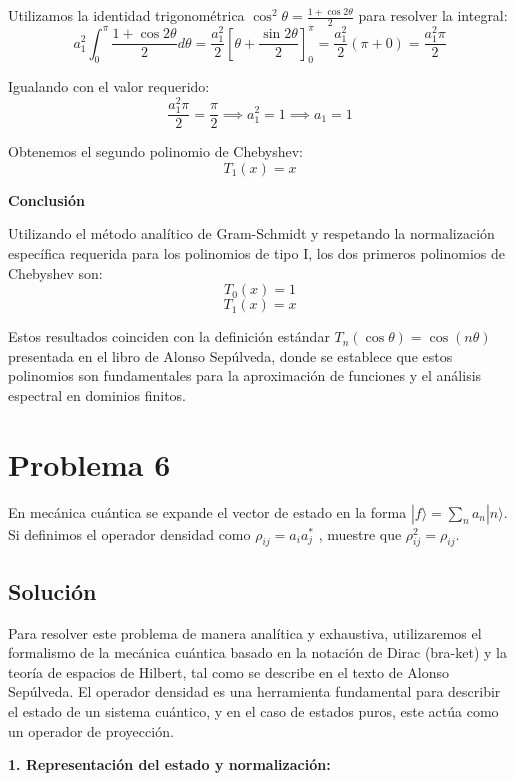 \documentclass[a4paper]{article}
\begin{document}
Utilizamos la identidad trigonométrica $\cos^2 \theta = \frac{1 + \cos 2\theta}{2}$ para resolver la integral:
$$ a_1^2 \int_{0}^{\pi} \frac{1 + \cos 2\theta}{2} d\theta = \frac{a_1^2}{2} \left[ \theta + \frac{\sin 2\theta}{2} \right]_{0}^{\pi} = \frac{a_1^2}{2} (\pi + 0) = \frac{a_1^2 \pi}{2} $$

Igualando con el valor requerido:
$$ \frac{a_1^2 \pi}{2} = \frac{\pi}{2} \implies a_1^2 = 1 \implies a_1 = 1 $$

Obtenemos el segundo polinomio de Chebyshev:
$$ T_1(x) = x $$

\textbf{Conclusión}

Utilizando el método analítico de Gram-Schmidt y respetando la normalización específica requerida para los polinomios de tipo I, los dos primeros polinomios de Chebyshev son:
$$ T_0(x) = 1 $$
$$ T_1(x) = x $$

Estos resultados coinciden con la definición estándar $T_n(\cos \theta) = \cos(n\theta)$ presentada en el libro de Alonso Sepúlveda, donde se establece que estos polinomios son fundamentales para la aproximación de funciones y el análisis espectral en dominios finitos.


\section{Problema 6}
En mecánica cuántica se expande el vector de estado en la forma $|f⟩ = \sum_n a_n|n⟩.$ Si definimos el operador densidad como $\rho_{ij} = a_i a^*_j$ , muestre que $\rho^2_{ij} = \rho_{ij}.$

\subsection{Solución}

Para resolver este problema de manera analítica y exhaustiva, utilizaremos el formalismo de la mecánica cuántica basado en la notación de Dirac (bra-ket) y la teoría de espacios de Hilbert, tal como se describe en el texto de Alonso Sepúlveda. El operador densidad es una herramienta fundamental para describir el estado de un sistema cuántico, y en el caso de estados puros, este actúa como un operador de proyección.

\textbf{1. Representación del estado y normalización:}
\end{document}
